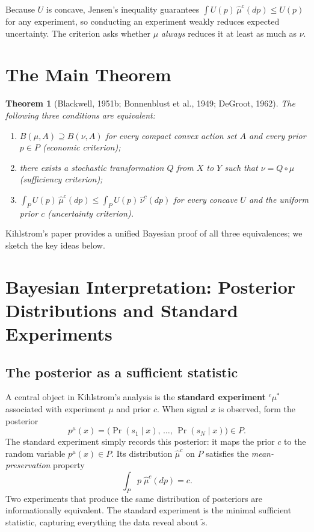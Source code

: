 \documentclass[12pt]{article}
\newtheorem{theorem}{Theorem}
\begin{document}
Because $U$ is concave, Jensen's inequality guarantees
$\int U(p)\,\hat\mu^c(dp) \leq U(p)$ for any experiment, so conducting an
experiment weakly reduces expected uncertainty.  The criterion asks whether
$\mu$ \emph{always} reduces it at least as much as $\nu$.

\section{The Main Theorem}

\begin{theorem}[Blackwell, 1951b; Bonnenblust et al., 1949; DeGroot, 1962]
\label{thm:blackwell}
The following three conditions are equivalent:
\begin{enumerate}[label=(\roman*)]
\item $B(\mu, A) \supseteq B(\nu, A)$ for every compact convex action set $A$
      and every prior $p \in P$ \emph{(economic criterion)};
\item there exists a stochastic transformation $Q$ from $X$ to $Y$ such that
      $\nu = Q \circ \mu$ \emph{(sufficiency criterion)};
\item $\int_P U(p)\,\hat\mu^c(dp) \leq \int_P U(p)\,\hat\nu^c(dp)$ for every
      concave $U$ and the uniform prior $c$ \emph{(uncertainty criterion)}.
\end{enumerate}
\end{theorem}

\noindent Kihlstrom's paper provides a unified Bayesian proof of all three
equivalences; we sketch the key ideas below.

\section{Bayesian Interpretation: Posterior Distributions and Standard Experiments}

\subsection{The posterior as a sufficient statistic}

A central object in Kihlstrom's analysis is the \textbf{standard experiment}
${}^c\mu^*$ associated with experiment $\mu$ and prior $c$.  When signal $x$
is observed, form the posterior
\[
p^\mu(x) = \bigl(\Pr(s_1 \mid x),\, \ldots,\, \Pr(s_N \mid x)\bigr) \in P.
\]
The standard experiment simply records this posterior: it maps the prior $c$
to the random variable $p^\mu(x) \in P$.  Its distribution $\hat\mu^c$ on $P$
satisfies the \emph{mean-preservation} property
\[
\int_P p\;\hat\mu^c(dp) = c.
\]
Two experiments that produce the same distribution of posteriors are
informationally equivalent.  The standard experiment is the minimal sufficient
statistic, capturing everything the data reveal about $\tilde{s}$.
\end{document}
